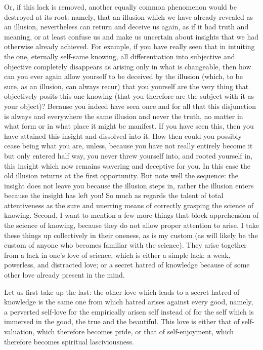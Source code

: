 Or, if this lack is removed,
another equally common phenomenon
would be destroyed at its root:
namely, that an illusion which
we have already revealed as an illusion,
nevertheless can return and deceive us again,
as if it had truth and meaning,
or at least confuse us and make us uncertain
about insights that we had otherwise already achieved.
For example, if you have really seen that
in intuiting the one, eternally self-same knowing,
all differentiation into subjective and objective
completely disappears as arising only in what is changeable,
then how can you ever again allow yourself
to be deceived by the illusion
(which, to be sure, as an illusion, can always recur)
that you yourself are the very thing
that objectively posits this one knowing
(that you therefore are the subject with it as your object)?
Because you indeed have seen once and for all
that this disjunction is always and everywhere the same
illusion and never the truth,
no matter in what form or in what place it might be manifest.
If you have seen this, then you have attained this insight
and dissolved into it.
How then could you possibly cease being what you are, unless,
because you have not really entirely become it
but only entered half way,
you never threw yourself into,
and rooted yourself in,
this insight which now remains
wavering and deceptive for you.
In this case the old illusion returns
at the first opportunity.
But note well the sequence:
the insight does not leave you
because the illusion steps in,
rather the illusion enters
because the insight has left you!
So much as regards the talent of
total attentiveness as the sure and unerring
means of correctly grasping the science of knowing.
Second, I want to mention a few more things
that block apprehension of the science of knowing,
because they do not allow proper attention to arise.
I take these things up collectively in their oneness,
as is my custom (as will likely be the
custom of anyone who becomes familiar with the science).
They arise together from a lack in one’s love of science,
which is either a simple lack:
a weak, powerless, and distracted love;
or a secret hatred of knowledge because of
some other love already present in the mind.

Let us first take up the last:
the other love which leads
to a secret hatred of knowledge is
the same one from which hatred
arises against every good,
namely, a perverted self-love
for the empirically arisen self
instead of for the self which is immersed
in the good, the true and the beautiful.
This love is either that of self-valuation,
which therefore becomes pride,
or that of self-enjoyment,
which therefore becomes spiritual lasciviousness.

